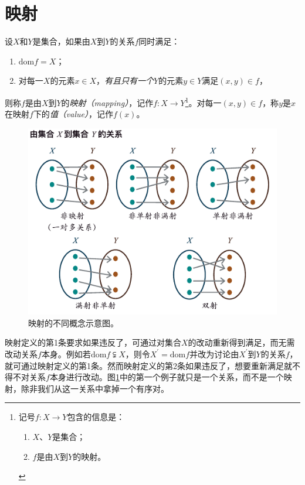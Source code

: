 \documentclass[../main.tex]{subfiles}
\begin{document}
\section{映射}
\begin{definition}
    设$X$和$Y$是集合，如果由$X$到$Y$的关系$f$同时满足：
    \begin{enumerate}
        \item $\mathrm{dom}f=X$；
        \item 对每一$X$的元素$x\in X$，\emph{有且只有一个}$Y$的元素$y\in Y$满足$\left(x,y\right)\in f$，
    \end{enumerate}
    则称$f$是由$X$到$Y$的\emph{映射（mapping）}，记作$f:X\rightarrow Y$\footnote{记号$f:X\rightarrow Y$包含的信息是：
        \begin{enumerate}
            \item $X$、$Y$是集合；
            \item $f$是由$X$到$Y$的映射。
        \end{enumerate}
    }。对每一$\left(x,y\right)\in f$，称$y$是$x$在映射$f$下的\emph{值（value）}，记作$f\left(x\right)$。
\end{definition}

\begin{figure}[htbp]
    \centering
    \includegraphics{../images/mapping.pdf}
    \caption{映射的不同概念示意图。}
    \label{fig:II.1.3}
\end{figure}

映射定义的第1条要求如果违反了，可通过对集合$X$的改动重新得到满足，而无需改动关系$f$本身。例如若$\mathrm{dom}f\subsetneqq X$，则令$X^\prime=\mathrm{dom}f$并改为讨论由$X^\prime$到$Y$的关系$f$，就可通过映射定义的第1条。然而映射定义的第2条如果违反了，想要重新满足就不得不对关系$f$本身进行改动。图\ref{fig:II.1.3}中的第一个例子就只是一个关系，而不是一个映射，除非我们从这一关系中拿掉一个有序对。
\end{document}
